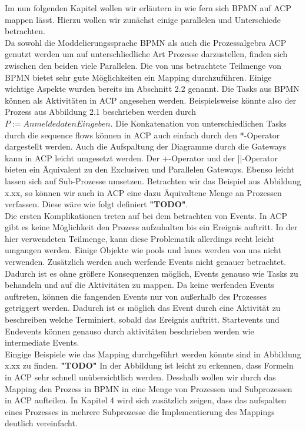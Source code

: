 Im nun folgenden Kapitel wollen wir erläutern in wie fern sich BPMN auf ACP mappen lässt. Hierzu wollen wir zunächst einige parallelen und Unterschiede betrachten. \\
Da sowohl die Moddelierungssprache BPMN als auch die Prozessalgebra ACP genutzt werden um auf unterschliedliche Art Prozesse darzustellen, finden sich zwischen den beiden viele Parallelen. Die von uns betrachtete Teilmenge von BPMN bietet sehr gute Möglichkeiten ein Mapping durchzuführen. Einige wichtige Aspekte wurden bereits im Abschnitt 2.2 genannt. Die Tasks aus BPMN können als Aktivitäten in ACP angesehen werden. Beispielsweise könnte also der Prozess aus Abbildung 2.1 beschrieben werden durch $P:=AnmeldedatenEingeben.$ Die Konkatenation von unterschiedlichen Tasks durch die sequence flows können in ACP auch einfach durch den *-Operator dargestellt werden. Auch die Aufspaltung der Diagramme durch die Gateways kann in ACP leicht umgesetzt werden. Der +-Operator und der ||-Operator bieten ein Äquivalent zu den Exclusiven und Parallelen Gateways. Ebenso leicht lassen sich auf Sub-Prozesse umsetzen. Betrachten wir das Beispiel aus Abbildung x.xx, so können wir auch in ACP eine dazu Äquivaltene Menge an Prozessen verfassen. Diese wäre wie folgt definiert \textbf{"TODO"}.\\
Die ersten Komplikationen treten auf bei dem betrachten von Events. In ACP gibt es keine Möglichkeit den Prozess aufzuhalten bis ein Ereignis auftritt. In der hier verwendeten Teilmenge, kann diese Problematik allerdings recht leicht umgangen werden. Einige Objekte wie pools und lanes werden von uns nicht verwenden. Zusätzlich werden auch werfende Events nicht genauer betrachtet. Dadurch ist es ohne größere Konsequenzen möglich, Events genauso wie Tasks zu behandeln und auf die Aktivitäten zu mappen. Da keine werfenden Events auftreten, können die fangenden Events nur von außerhalb des Prozesses getriggert werden. Dadurch ist es möglich das Event durch eine Aktivität zu beschreiben welche Terminiert, sobald das Ereignis auftritt. Startevents und Endevents können genauso durch aktivitäten beschrieben werden wie intermediate Events. \\
Eingige Beispiele wie das Mapping durchgeführt werden könnte sind in Abbildung x.xx zu finden. \textbf{"TODO"}
In der Abbildung ist leicht zu erkennen, dass Formeln in ACP sehr schnell unübersichtlich werden. Desshalb wollen wir durch das Mapping den Prozess in BPMN in eine Menge von Prozessen und Subprozessen in ACP aufteilen. In Kapitel 4 wird sich zusätzlich zeigen, dass das aufspalten eines Prozesses in mehrere Subprozesse die Implementierung des Mappings deutlich vereinfacht.\\

